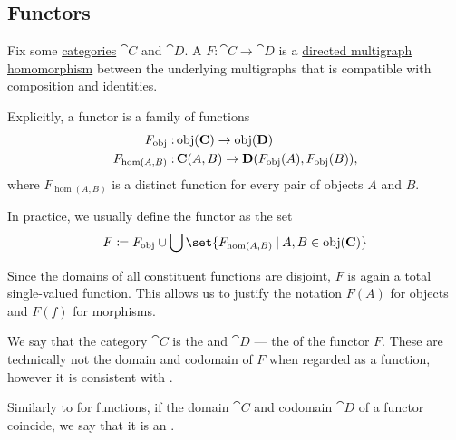\subsection{Functors}\label{subsec:functors}

\begin{definition}\label{def:functor}
  Fix some \hyperref[def:category]{categories} \( \cat{C} \) and \( \cat{D} \). A  \( F: \cat{C} \to \cat{D} \) is a \hyperref[def:directed_multigraph/homomorphism]{directed multigraph homomorphism} between the underlying multigraphs that is compatible with composition and identities.

  Explicitly, a functor is a family of functions
  \begin{equation}\label{eq:def:functor_as_family_of_function}
    \begin{aligned}
      F_{\operatorname{obj}}:       &\operatorname{obj}(\operatorname{\mathbf{C}}) \to \operatorname{obj}(\operatorname{\mathbf{D}}) \\
      F_{\hom(A, B)}: &\operatorname{\mathbf{C}}(A, B) \to \operatorname{\mathbf{D}}(F_{\operatorname{obj}}(A), F_{\operatorname{obj}}(B)),
    \end{aligned}
  \end{equation}
  where \( F_{\hom(A, B)} \) is a distinct function for every pair of objects \( A \) and \( B \).

  In practice, we usually define the functor as the set
  \begin{equation}\label{eq:def:functor_as_single_function}
    F \coloneqq F_{\obj} \cup \bigcup\set{ F_{\hom(A, B)} \given A, B \in \obj(\cat{C}) }
  \end{equation}

  Since the domains of all constituent functions are disjoint, \( F \) is again a total single-valued function. This allows us to justify the notation \( F(A) \) for objects and \( F(f) \) for morphisms.

  \begin{thmenum}[resume=def:functor]
     We say that the category \( \cat{C} \) is the  and \( \cat{D} \) --- the  of the functor \( F \). These are technically not the domain and codomain of \( F \) when regarded as a function, however it is consistent with .

     Similarly to  for functions, if the domain \( \cat{C} \) and codomain \( \cat{D} \) of a functor coincide, we say that it is an .
  \end{thmenum}


\end{definition}
